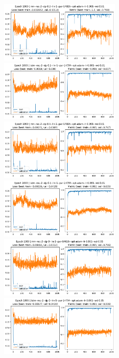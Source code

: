 \documentclass[a4paper,10pt]{article}
\begin{document}
\begin{figure}[H]
      \begin{center}
            \includegraphics[width=6cm]{figures/rnn--rec-2--dp-0.2--lin-1--par-14026--opt-adam--lr-0.001--wd-0.01--e-1000.png}
            \includegraphics[width=6cm]{figures/lstm--rec-2--dp-0.2--lin-1--par-14794--opt-adam--lr-0.001--wd-0.01--e-1000.png}
            \includegraphics[width=6cm]{figures/rnn--rec-2--dp-0.5--lin-1--par-14026--opt-adam--lr-0.001--wd-0.01--e-1000.png}
            \includegraphics[width=6cm]{figures/lstm--rec-2--dp-0.5--lin-1--par-14794--opt-adam--lr-0.001--wd-0.01--e-1000.png}
            \includegraphics[width=6cm]{figures/rnn--rec-2--dp-0--lin-1--par-14026--opt-adam--lr-0.001--wd-0.05--e-1000.png}
            \includegraphics[width=6cm]{figures/lstm--rec-2--dp-0--lin-1--par-14794--opt-adam--lr-0.001--wd-0.05--e-1000.png}

\end{center}
\end{figure}
\end{document}
